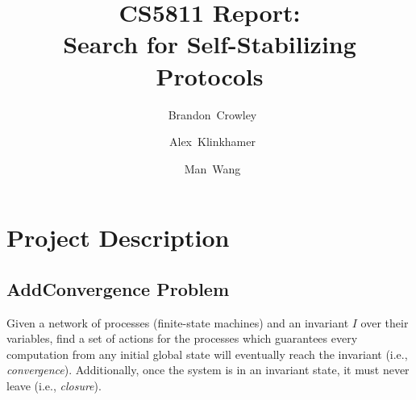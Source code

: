 


\usepackage{tikz}
\usetikzlibrary{arrows}

\usepackage{float}

\usepackage{algorithm}
\usepackage{algorithmic}

\setlength{\abovedisplayskip}{0.5em}
\setlength{\abovedisplayshortskip}{0.5em}
\setlength{\belowdisplayskip}{0.5em}
\setlength{\belowdisplayshortskip}{0.5em}
\setlength{\abovecaptionskip}{0.0em}
\setlength{\belowcaptionskip}{0.0em}

\def\imagetop#1{\vtop{\null\hbox{#1}}}

\newcommand{\xnsysinst}[3]{%
\begin{figure}[H]
\begin{tabular}[c]{l|l}
 \imagetop{#2} &
 \imagetop{\begin{tabular}[c]{@{}l@{}}#3\end{tabular}} \\
\end{tabular}
\caption{Problem instance: \texttt{#1}}
\end{figure}}

\newcommand{\unique}{\exists!}


\title{
 CS5811 Report:\\
 Search for Self-Stabilizing Protocols
}

\author{~Brandon~Crowley\and~Alex~Klinkhamer\and~Man~Wang}
\maketitle

\newpage
\tableofcontents
\newpage

\section{Project Description}

\subsection{AddConvergence Problem}

Given a network of processes (finite-state machines) and an invariant $I$ over their variables, find a set of actions for the processes which guarantees every computation from any initial global state will eventually reach the invariant (i.e., {\it convergence}).
Additionally, once the system is in an invariant state, it must never leave (i.e., {\it closure}).

